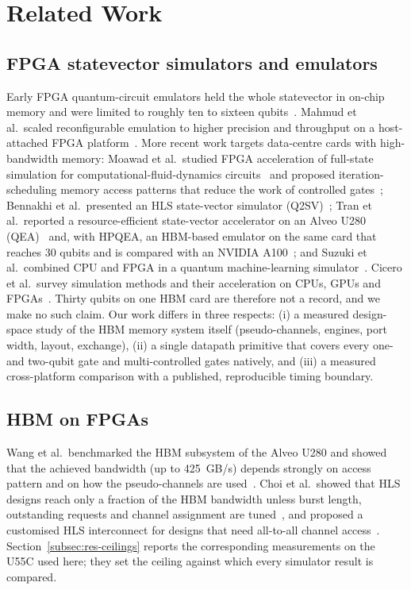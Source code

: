 \section{Related Work}\label{sec:related}

\subsection{FPGA statevector simulators and emulators}\label{subsec:related-fpga}

Early FPGA quantum-circuit emulators held the whole statevector in on-chip memory and were limited to roughly ten to sixteen qubits~\cite{khalid2004fpga,aminian2008fpga,lee2016fpga,pilch2019fpga}. Mahmud et al.\ scaled reconfigurable emulation to higher precision and throughput on a host-attached FPGA platform~\cite{mahmud2019scaling}. More recent work targets data-centre cards with high-bandwidth memory: Moawad et al.\ studied FPGA acceleration of full-state simulation for computational-fluid-dynamics circuits~\cite{moawad2022cfd} and proposed iteration-scheduling memory access patterns that reduce the work of controlled gates~\cite{moawad2024iteration}; Bennakhi et al.\ presented an HLS state-vector simulator (Q2SV)~\cite{bennakhi2025q2sv}; Tran et al.\ reported a resource-efficient state-vector accelerator on an Alveo U280 (QEA)~\cite{tran2025qea} and, with HPQEA, an HBM-based emulator on the same card that reaches 30 qubits and is compared with an NVIDIA A100~\cite{tran2025hpqea}; and Suzuki et al.\ combined CPU and FPGA in a quantum machine-learning simulator~\cite{suzuki2023hybrid}. Cicero et al.\ survey simulation methods and their acceleration on CPUs, GPUs and FPGAs~\cite{cicero2024review}. Thirty qubits on one HBM card are therefore not a record, and we make no such claim. Our work differs in three respects: (i) a measured design-space study of the HBM memory system itself (pseudo-channels, engines, port width, layout, exchange), (ii) a single datapath primitive that covers every one- and two-qubit gate and multi-controlled gates natively, and (iii) a measured cross-platform comparison with a published, reproducible timing boundary.

\subsection{HBM on FPGAs}\label{subsec:related-hbm}

Wang et al.\ benchmarked the HBM subsystem of the Alveo U280 and showed that the achieved bandwidth (up to 425~GB/s) depends strongly on access pattern and on how the pseudo-channels are used~\cite{wang2020shuhai}. Choi et al.\ showed that HLS designs reach only a fraction of the HBM bandwidth unless burst length, outstanding requests and channel assignment are tuned~\cite{choi2020hlshbm}, and proposed a customised HLS interconnect for designs that need all-to-all channel access~\cite{choi2021hbmconnect}. Section~\ref{subsec:res-ceilings} reports the corresponding measurements on the U55C used here; they set the ceiling against which every simulator result is compared.

